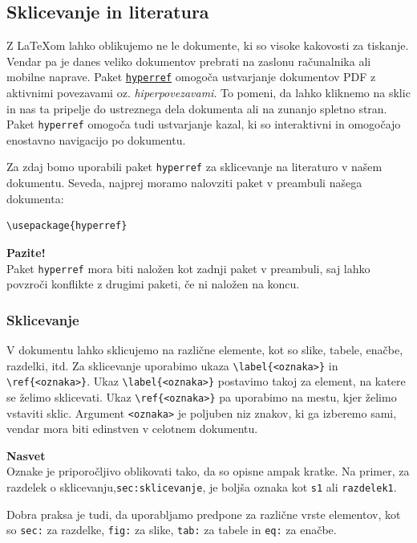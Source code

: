 \subsection{Sklicevanje in literatura}

Z LaTeXom lahko oblikujemo ne le dokumente, ki so visoke kakovosti za tiskanje. Vendar pa je danes veliko dokumentov prebrati na zaslonu računalnika ali mobilne naprave.
Paket \href{https://ctan.org/pkg/hyperref}{\texttt{hyperref}} omogoča ustvarjanje dokumentov PDF z aktivnimi povezavami oz. \textit{hiperpovezavami}.
To pomeni, da lahko kliknemo na sklic in nas ta pripelje do ustreznega dela dokumenta ali na zunanjo spletno stran.
Paket \texttt{hyperref} omogoča tudi ustvarjanje kazal, ki so interaktivni in omogočajo enostavno navigacijo po dokumentu.

Za zdaj bomo uporabili paket \texttt{hyperref} za sklicevanje na literaturo v našem dokumentu.
Seveda, najprej moramo nalovziti paket v preambuli našega dokumenta:

\begin{verbatim}
\usepackage{hyperref}
\end{verbatim}

\begin{framed}
\textbf{Pazite!}\\
Paket \texttt{hyperref} mora biti naložen kot zadnji paket v preambuli, saj lahko povzroči konflikte z drugimi paketi, če ni naložen na koncu.
\end{framed}

\subsubsection{Sklicevanje}

V dokumentu lahko sklicujemo na različne elemente, kot so slike, tabele, enačbe, razdelki, itd.
Za sklicevanje uporabimo ukaza \texttt{{\textbackslash}label\{\textless oznaka\textgreater \}} in \texttt{{\textbackslash}ref\{\textless oznaka\textgreater \}}.
Ukaz \texttt{{\textbackslash}label\{\textless oznaka\textgreater \}} postavimo takoj za element, na katere se želimo sklicevati. Ukaz \texttt{{\textbackslash}ref\{\textless oznaka\textgreater \}} pa uporabimo na mestu, kjer želimo vstaviti sklic. Argument \texttt{\textless oznaka\textgreater } je poljuben niz znakov, ki ga izberemo sami, vendar mora biti edinstven v celotnem dokumentu.

\begin{example}\label{eg_sklici_1}\end{example}\begin{framed}
\textbf{Nasvet}\\
Oznake je priporočljivo oblikovati tako, da so opisne ampak kratke. Na primer, za razdelek o sklicevanju,\texttt{sec:sklicevanje}, je boljša oznaka kot \texttt{s1} ali \texttt{razdelek1}.

Dobra praksa je tudi, da uporabljamo predpone za različne vrste elementov, kot so \texttt{sec:} za razdelke, \texttt{fig:} za slike, \texttt{tab:} za tabele in \texttt{eq:} za enačbe.
\end{framed}

